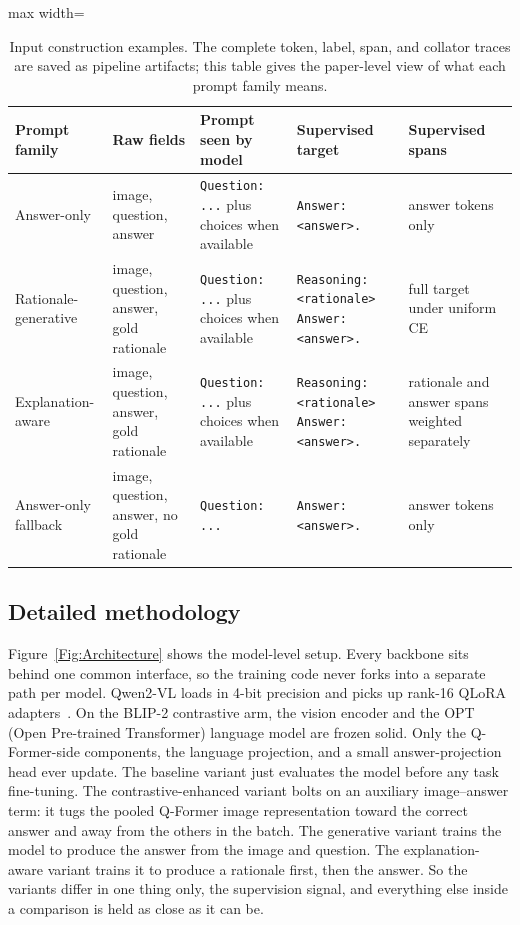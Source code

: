 \documentclass[preprint,12pt]{elsarticle}
\begin{document}
\begin{table}[!ht]
\centering
\caption{Input construction examples. The complete token, label, span, and collator traces are saved as pipeline artifacts; this table gives the paper-level view of what each prompt family means.}
\label{tab:InputConstruction}
\scriptsize
\begin{adjustbox}{max width=\textwidth}
\begin{tabular}{|p{2.5cm}|p{3.6cm}|p{4.5cm}|p{4.5cm}|p{2.8cm}|}
\hline
\textbf{Prompt family} & \textbf{Raw fields} & \textbf{Prompt seen by model} & \textbf{Supervised target} & \textbf{Supervised spans} \\ \hline
Answer-only & image, question, answer & \texttt{Question: ...} plus choices when available & \texttt{Answer: <answer>.} & answer tokens only \\
Rationale-generative & image, question, answer, gold rationale & \texttt{Question: ...} plus choices when available & \texttt{Reasoning: <rationale> Answer: <answer>.} & full target under uniform CE \\
Explanation-aware & image, question, answer, gold rationale & \texttt{Question: ...} plus choices when available & \texttt{Reasoning: <rationale> Answer: <answer>.} & rationale and answer spans weighted separately \\
Answer-only fallback & image, question, answer, no gold rationale & \texttt{Question: ...} & \texttt{Answer: <answer>.} & answer tokens only \\ \hline
\end{tabular}
\end{adjustbox}
\end{table}

\subsection{Detailed methodology}
Figure~\ref{Fig:Architecture} shows the model-level setup.
Every backbone sits behind one common interface, so the training code never forks into a separate path per model.
Qwen2-VL loads in 4-bit precision and picks up rank-16 QLoRA adapters~\cite{hu2022lora,dettmers2023qlora}.
On the BLIP-2 contrastive arm, the vision encoder and the OPT (Open Pre-trained Transformer) language model are frozen solid.
Only the Q-Former-side components, the language projection, and a small answer-projection head ever update.
The baseline variant just evaluates the model before any task fine-tuning.
The contrastive-enhanced variant bolts on an auxiliary image--answer term: it tugs the pooled Q-Former image representation toward the correct answer and away from the others in the batch.
The generative variant trains the model to produce the answer from the image and question.
The explanation-aware variant trains it to produce a rationale first, then the answer.
So the variants differ in one thing only, the supervision signal, and everything else inside a comparison is held as close as it can be.
\end{document}
